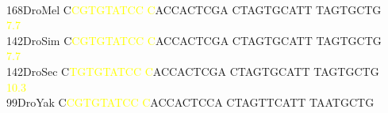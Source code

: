 \documentclass[11pt,twoside,reqno,a4paper]{article}
\begin{document}
{\\
168\hspace*{1\charwidth}DroMel	C\textcolor{yellow}{C}\textcolor{yellow}{G}\textcolor{yellow}{T}\textcolor{yellow}{G}\textcolor{yellow}{T}\textcolor{yellow}{A}\textcolor{yellow}{T}\textcolor{yellow}{C}\textcolor{yellow}{C}	\textcolor{yellow}{C}ACCACTCGA	CTAGTGCATT	TAGTGCTG\\
\hspace*{4\charwidth}\hspace*{7\charwidth}\hspace*{1\charwidth}\textcolor{yellow}{7.7}\hspace*{1\charwidth}\hspace*{1\charwidth}\hspace*{1\charwidth}\\
142\hspace*{1\charwidth}DroSim	C\textcolor{yellow}{C}\textcolor{yellow}{G}\textcolor{yellow}{T}\textcolor{yellow}{G}\textcolor{yellow}{T}\textcolor{yellow}{A}\textcolor{yellow}{T}\textcolor{yellow}{C}\textcolor{yellow}{C}	\textcolor{yellow}{C}ACCACTCGA	CTAGTGCATT	TAGTGCTG\\
\hspace*{4\charwidth}\hspace*{7\charwidth}\hspace*{1\charwidth}\textcolor{yellow}{7.7}\hspace*{1\charwidth}\hspace*{1\charwidth}\hspace*{1\charwidth}\\
142\hspace*{1\charwidth}DroSec	C\textcolor{yellow}{T}\textcolor{yellow}{G}\textcolor{yellow}{T}\textcolor{yellow}{G}\textcolor{yellow}{T}\textcolor{yellow}{A}\textcolor{yellow}{T}\textcolor{yellow}{C}\textcolor{yellow}{C}	\textcolor{yellow}{C}ACCACTCGA	CTAGTGCATT	TAGTGCTG\\
\hspace*{4\charwidth}\hspace*{7\charwidth}\hspace*{1\charwidth}\textcolor{yellow}{10.3}\hspace*{1\charwidth}\hspace*{1\charwidth}\hspace*{1\charwidth}\\
99\hspace*{2\charwidth}DroYak	C\textcolor{yellow}{C}\textcolor{yellow}{G}\textcolor{yellow}{T}\textcolor{yellow}{G}\textcolor{yellow}{T}\textcolor{yellow}{A}\textcolor{yellow}{T}\textcolor{yellow}{C}\textcolor{yellow}{C}	\textcolor{yellow}{C}ACCACTCCA	CTAGTTCATT	TAATGCTG\\
}
\end{document}
